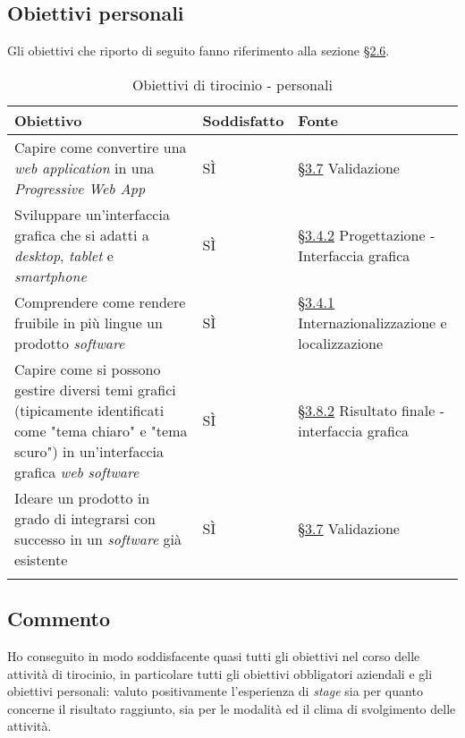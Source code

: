 \subsection{Obiettivi personali}
Gli obiettivi che riporto di seguito fanno riferimento alla sezione \hyperref[sec:obiettivi-personali]{§2.6}.

\begin{longtable}{>{\centering\arraybackslash}m{}>{\centering\arraybackslash}m{}>{\centering\arraybackslash}m{}}
    \hline
    \rowcolor{black}
    \color{white}\textbf{Obiettivo} & \color{white}\textbf{Soddisfatto} & \color{white}\textbf{Fonte} \\
    \hline
    \endhead %
    Capire come convertire una \textit{web application} in una \textit{Progressive Web App} & SÌ & \hyperref[sec:validazione]{§3.7} Validazione \\
    \hline
    Sviluppare un'interfaccia grafica che si adatti a \textit{desktop}, \textit{tablet} e \textit{smartphone} & SÌ & \hyperref[subsec:interfaccia]{§3.4.2} Progettazione - Interfaccia grafica \\
    \hline
    Comprendere come rendere fruibile in più lingue un prodotto \textit{software} & SÌ & \hyperref[subsec:internazionalizzazione]{§3.4.1} Internazionalizzazione e localizzazione \\
    \hline
    Capire come si possono gestire diversi temi grafici (tipicamente identificati come "tema chiaro" e "tema scuro") in un'interfaccia grafica \textit{web} \textit{software} & SÌ & \hyperref[subsec:interfaccia-risultato]{§3.8.2} Risultato finale - interfaccia grafica \\
    \hline
    Ideare un prodotto in grado di integrarsi con successo in un \textit{software} già esistente & SÌ & \hyperref[sec:validazione]{§3.7} Validazione \\
    \hline
    \caption{Obiettivi di tirocinio - personali}
\end{longtable}

\subsection{Commento}
Ho conseguito in modo soddisfacente quasi tutti gli obiettivi nel corso delle attività di tirocinio, in particolare tutti gli obiettivi obbligatori aziendali e gli obiettivi personali: valuto positivamente l'esperienza di \textit{stage} sia per quanto concerne il risultato raggiunto, 
sia per le modalità ed il clima di svolgimento delle attività.

